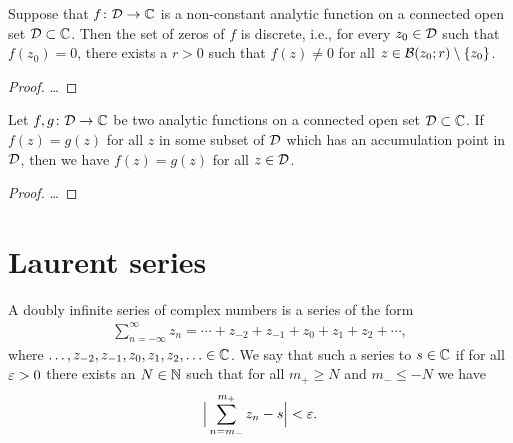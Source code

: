 \begin{theorem}
  \label{thm:discrete_mapping_theorem}
  Suppose that $f \colon \Domain \to \bC$ is a non-constant
  analytic function on a connected open set $\Domain \subset \bC$.
  Then the set of zeros of $f$ is discrete, i.e., for
  every $z_0 \in \Domain$ such that $f(z_0)=0$,
  there exists a $r>0$ such that $f(z) \ne 0$
  for all $z \in \BallRC{r}{z_0} \setminus \set{z_0}$.
\end{theorem}
\begin{proof}
  \ldots
\end{proof}

\begin{corollary}
  \label{cor:ANALYTIC_CONTINUATION}
  Let $f, g \colon \Domain \to \bC$ be two analytic functions on a connected
  open set $\Domain \subset \bC$.
  If $f(z) = g(z)$ for all $z$ in
  some subset of $\Domain$ which has an accumulation point in $\Domain$,
  then we have $f(z) = g(z)$ for all $z \in \Domain$.
\end{corollary}
\begin{proof}
  \ldots
\end{proof}



\section{Laurent series}

\begin{definition}
  \label{def:doubly_infinite_series}
  A doubly infinite series of complex numbers is a series of the form
  \begin{align*}
    \sum_{n=-\infty}^\infty z_n
      = \cdots + z_{-2} + z_{-1} + z_0 + z_1 + z_2 + \cdots ,
  \end{align*}
  where $\ldots, z_{-2}, z_{-1}, z_0, z_1, z_2, \ldots \in \bC$.
  We say that such a series  to $s \in \bC$ if
  for all $\eps > 0$ there exists an $N \in \bN$
  such that for all $m_+ \ge N$ and $m_- \le -N$ we have
  \begin{align*}
    \Big| \sum_{n=m_-}^{m_+} z_n - s \Big| < \eps .
  \end{align*}
\end{definition}

